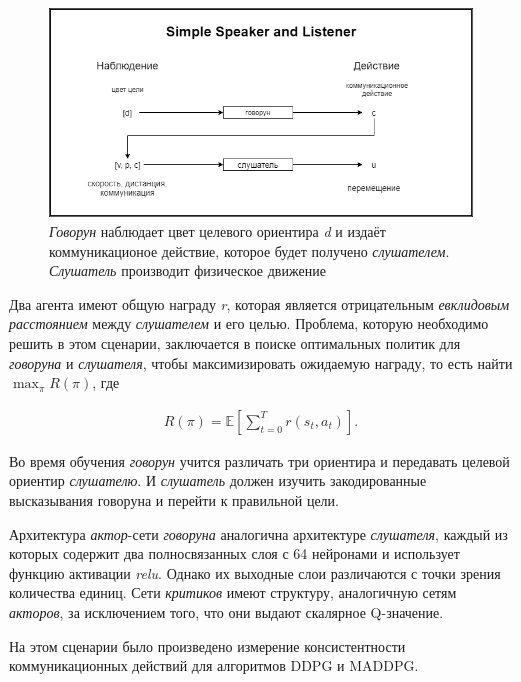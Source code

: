 \begin{figure}[ht!]
    \center
    \includegraphics [scale=0.60] {my_folder/images/ch4/simple_speaker_listener.png}
    \caption{\textit{Говорун} наблюдает цвет целевого ориентира \textit{d} и издаёт коммуникационое действие, которое будет получено \textit{слушателем}. \textit{Слушатель} производит физическое движение}
    \label{fig:ch4-ssl}
\end{figure}

Два агента имеют общую награду \textit{r}, которая является отрицательным \textit{евклидовым расстоянием} между \textit{слушателем} и его целью. Проблема, которую необходимо решить в этом сценарии, заключается в поиске оптимальных политик для \textit{говоруна} и \textit{слушателя}, чтобы максимизировать ожидаемую награду, то есть найти $\max_{\pi}R(\pi)$, где

\begin{equation}
    \begin{multlined}
        R(\pi) = \mathbb{E}[\sum_{t=0}^{T}r(s_t, a_t)].
    \end{multlined}
\end{equation}

Во время обучения \textit{говорун} учится различать три ориентира и передавать целевой ориентир \textit{слушателю}. И \textit{слушатель} должен изучить закодированные высказывания говоруна и перейти к правильной цели.

Архитектура \textit{актор}-сети \textit{говоруна} аналогична архитектуре \textit{слушателя}, каждый из которых содержит два полносвязанных слоя с 64 нейронами и использует функцию активации \textit{relu}. Однако их выходные слои различаются с точки зрения количества единиц. Сети \textit{критиков} имеют структуру, аналогичную сетям \textit{акторов}, за исключением того, что они выдают скалярное Q-значение.

На этом сценарии было произведено измерение консистентности коммуникационных действий для алгоритмов DDPG и MADDPG.

